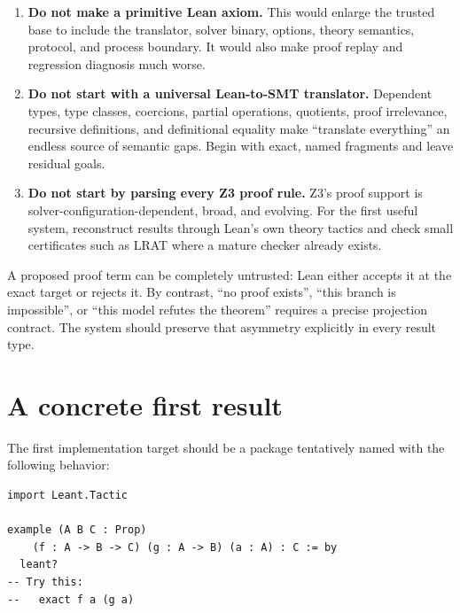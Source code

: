 \documentclass[11pt,letterpaper,openany]{report}
\newcommand{\code}[1]{\texttt{\detokenize{#1}}}
\begin{document}
\begin{enumerate}
  \item \textbf{Do not make \code{unsat} a primitive Lean axiom.} This would enlarge the
        trusted base to include the translator, solver binary, options, theory
        semantics, protocol, and process boundary. It would also make proof replay and
        regression diagnosis much worse.
  \item \textbf{Do not start with a universal Lean-to-SMT translator.} Dependent types,
        type classes, coercions, partial operations, quotients, proof irrelevance,
        recursive definitions, and definitional equality make ``translate everything''
        an endless source of semantic gaps. Begin with exact, named fragments and
        leave residual goals.
  \item \textbf{Do not start by parsing every Z3 proof rule.} Z3's proof support is
        solver-configuration-dependent, broad, and evolving. For the first useful
        system, reconstruct results through Lean's own theory tactics and check small
        certificates such as LRAT where a mature checker already exists.
\end{enumerate}

\begin{soundbox}[title=Positive results are cheap to trust; negative results are not]
A proposed proof term can be completely untrusted: Lean either accepts it at the
exact target or rejects it. By contrast, ``no proof exists'', ``this branch is
impossible'', or ``this model refutes the theorem'' requires a precise projection
contract. The system should preserve that asymmetry explicitly in every result type.
\end{soundbox}

\section{A concrete first result}

The first implementation target should be a package tentatively named
\code{Leant.Tactic} with the following behavior:

\begin{lstlisting}[language=LeanFour,caption={Proposed first user-facing command}]
import Leant.Tactic

example (A B C : Prop)
    (f : A -> B -> C) (g : A -> B) (a : A) : C := by
  leant?
-- Try this:
--   exact f a (g a)
\end{lstlisting}
\end{document}
